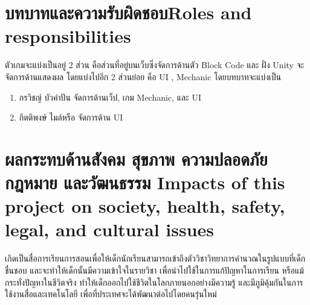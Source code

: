\section{\ifcpe บทบาทและความรับผิดชอบ\else Roles and responsibilities\fi}
ตัวเกมจะแบ่งเป็นอยู่ 2 ส่วน คือส่วนที่อยู่บนเว็บซึ่งจัดการด้านตัว Block Code และ ฝั่ง Unity จะจัดการด้านแสดงผล โดยแบ่งไปอีก
2 ส่วนย่อย คือ UI , Mechanic โดยบทบาทจะแบ่งเป็น
\begin{enumerate}
    \item กรวิชญ์ บัวคำปัน จัดการด้านเว็ป, เกม Mechanic, และ UI
    \item กิตติพงษ์ ไมล์หรือ จัดการด้าน UI
\end{enumerate}

\section{\ifcpe%
ผลกระทบด้านสังคม สุขภาพ ความปลอดภัย กฎหมาย และวัฒนธรรม
\else%
Impacts of this project on society, health, safety, legal, and cultural issues
\fi}

เกิดเป็นสื่อการเรียนการสอนเพื่อให้เด็กนักเรียนสามารถเข้าถึงตัววิชาวิทยาการคำนวณในรูปแบบที่เด็กชื่นชอบ 
และจะทำให้เด็กนั้นมีความเข้าใจในรายวิชา เพื่อนำไปใช้ในการแก้ปัญหาในการเรียน หรือแม้กระทั่งปัญหาในชีวิตจริง ทำให้เด็กออกไปใช้ชีวิตในโลกภายนอกอย่างมีความรู้ และมีภูมิคุ้มกันในการใช้งานสื่อและเทคโนโลยี เพื่อที่ประเทศจะได้พัฒนาต่อไปโดยคนรุ่นใหม่

